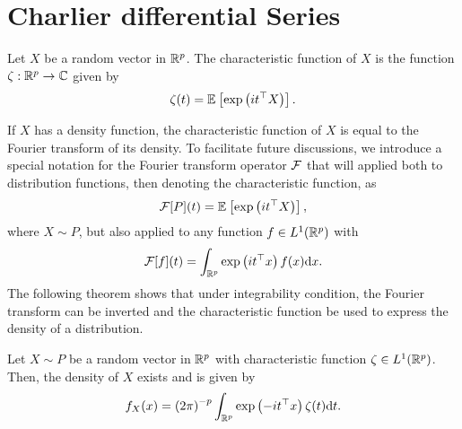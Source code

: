 \section{Charlier differential Series}


\begin{definition}
    Let $X$ be a random vector in $\Rp$. The characteristic function of $X$ is the function $\zeta : \Rp \rightarrow \C$ given by
    \begin{equation*}
        \zeta(t) = \expec{}{\expf{it^\top X}}.
    \end{equation*}
\end{definition}

If $X$ has a density function, the characteristic function of $X$ is equal to the Fourier transform of its density. To facilitate future discussions, we introduce a special notation for the Fourier transform operator $\F$ that will applied both to distribution functions, then denoting the characteristic function, as
\begin{equation} \label{eq-fourier-distrib}
    \F[P](t) = \expec{}{\expf{it^\top X}},
\end{equation}
where $X \sim P$, but also applied to any function $f \in L^1(\Rp)$ with
\begin{equation} \label{eq-fourier-density}
    \F[f](t) = \int_\Rp \expf{it^\top x}f(x)\d x.
\end{equation}
The following theorem shows that under integrability condition, the Fourier transform can be inverted and the characteristic function be used to express the density of a distribution.

\begin{theorem} \label{thm-char-inversion}
    Let $X \sim P$ be a random vector in $\Rp$ with characteristic function $\zeta \in L^1(\Rp)$. Then, the density of $X$ exists and is given by
    \begin{equation} \label{eq-density-via-charfun}
        f_X(x) = \left(2\pi\right)^{-p} \intRp{t}{ \expf{-it^\top x}\zeta(t) }.
    \end{equation}
\end{theorem}

